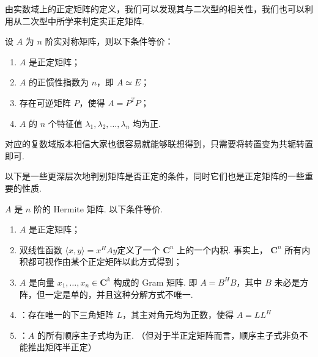 由实数域上的正定矩阵的定义，我们可以发现其与二次型的相关性，我们也可以利用从二次型中所学来判定实正定矩阵.

\begin{theorem}
    设 $ A $ 为 $ n $ 阶实对称矩阵，则以下条件等价：
    \begin{enumerate}
        \item $ A $ 是正定矩阵；

        \item $ A $ 的正惯性指数为 $ n $，即 $ A \simeq E $；

        \item 存在可逆矩阵 $ P $，使得 $ A = P^{T}P $；

        \item $ A $ 的 $ n $ 个特征值 $ \lambda_1, \lambda_2, \ldots, \lambda_n $ 均为正.
    \end{enumerate}
\end{theorem}

对应的复数域版本相信大家也很容易就能够联想得到，只需要将转置变为共轭转置即可.

以下是一些更深层次地判别矩阵是否正定的条件，同时它们也是正定矩阵的一些重要的性质.

\begin{theorem}
    $ A $ 是 $ n $ 阶的 Hermite 矩阵. 以下条件等价.
    \begin{enumerate}
        \item $ A $ 是正定矩阵；

        \item 双线性函数 $ \langle x, y \rangle = x^{H}Ay $定义了一个 $ \mathbf{C}^n $ 上的一个内积. 事实上， $ \mathbf{C}^n $ 所有内积都可视作由某个正定矩阵以此方式得到；

        \item $ A $ 是向量 $ x_1, \ldots , x_n \in \mathbf{C}^k $ 构成的
              Gram 矩阵. 即 $ A = B^{H}B $，其中 $ B $ 未必是方阵，但一定是单的，并且这种分解方式不唯一.

        \item {}：存在唯一的下三角矩阵 $ L $，其主对角元均为正数，使得 $ A = LL^{H} $

        \item {}：$ A $ 的所有顺序主子式均为正. （但对于半正定矩阵而言，顺序主子式非负不能推出矩阵半正定）
    \end{enumerate}
\end{theorem}

